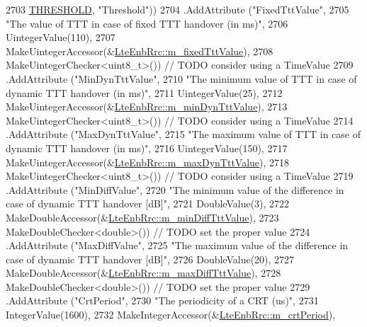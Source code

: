 \begin{DoxyCode}
2703                   \hyperlink{classns3_1_1LteEnbRrc_a92c80910218354db2ad7ac531f896c94adf9f2c22d2fbf5ed241d6dcf5ecccd3a}{THRESHOLD}, \textcolor{stringliteral}{"Threshold"}))
2704     .AddAttribute (\textcolor{stringliteral}{"FixedTttValue"},
2705         \textcolor{stringliteral}{"The value of TTT in case of fixed TTT handover (in ms)"},
2706         UintegerValue(110),
2707         MakeUintegerAccessor(&\hyperlink{classns3_1_1LteEnbRrc_aa71134df59929e78ccfa621bfadd3414}{LteEnbRrc::m\_fixedTttValue}),
2708         MakeUintegerChecker<uint8\_t>()) \textcolor{comment}{// TODO consider using a TimeValue}
2709     .AddAttribute (\textcolor{stringliteral}{"MinDynTttValue"},
2710         \textcolor{stringliteral}{"The minimum value of TTT in case of dynamic TTT handover (in ms)"},
2711         UintegerValue(25),
2712         MakeUintegerAccessor(&\hyperlink{classns3_1_1LteEnbRrc_a76d3b1fbe9168d1e581e709085ff7958}{LteEnbRrc::m\_minDynTttValue}),
2713         MakeUintegerChecker<uint8\_t>()) \textcolor{comment}{// TODO consider using a TimeValue}
2714     .AddAttribute (\textcolor{stringliteral}{"MaxDynTttValue"},
2715         \textcolor{stringliteral}{"The maximum value of TTT in case of dynamic TTT handover (in ms)"},
2716         UintegerValue(150),
2717         MakeUintegerAccessor(&\hyperlink{classns3_1_1LteEnbRrc_a79683e5ba7b9fff045f36e4bb5afce3a}{LteEnbRrc::m\_maxDynTttValue}),
2718         MakeUintegerChecker<uint8\_t>()) \textcolor{comment}{// TODO consider using a TimeValue    }
2719     .AddAttribute (\textcolor{stringliteral}{"MinDiffValue"},
2720         \textcolor{stringliteral}{"The minimum value of the difference in case of dynamic TTT handover [dB]"},
2721         DoubleValue(3),
2722         MakeDoubleAccessor(&\hyperlink{classns3_1_1LteEnbRrc_a8d4167d62f1ec725db35d049dd3610ba}{LteEnbRrc::m\_minDiffTttValue}),
2723         MakeDoubleChecker<double>()) \textcolor{comment}{// TODO set the proper value    }
2724     .AddAttribute (\textcolor{stringliteral}{"MaxDiffValue"},
2725         \textcolor{stringliteral}{"The maximum value of the difference in case of dynamic TTT handover [dB]"},
2726         DoubleValue(20),
2727         MakeDoubleAccessor(&\hyperlink{classns3_1_1LteEnbRrc_a07ebdb9974f2aed7c20c089b6d612948}{LteEnbRrc::m\_maxDiffTttValue}),
2728         MakeDoubleChecker<double>()) \textcolor{comment}{// TODO set the proper value}
2729     .AddAttribute (\textcolor{stringliteral}{"CrtPeriod"},
2730         \textcolor{stringliteral}{"The periodicity of a CRT (us)"},
2731         IntegerValue(1600),
2732         MakeIntegerAccessor(&\hyperlink{classns3_1_1LteEnbRrc_aace4582efc05d4990eaf4204aee468b7}{LteEnbRrc::m\_crtPeriod}),

\end{DoxyCode}
